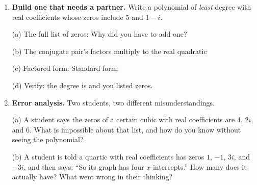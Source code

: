 \documentclass[10pt]{article}
\begin{document}
\begin{tcolorbox}[colback=white, colframe=black!40, title=\textbf{Tier A --- Approaching Proficiency},
    fonttitle=\bfseries, arc=1.5mm, left=3mm, right=3mm, top=2mm, bottom=2mm, breakable]
\begin{enumerate}[leftmargin=1.7em, itemsep=10pt]
    \vspace{2pt}
    (c) So the number of \emph{imaginary} zeros is \blank{1.2cm}. Check: is that number even?
    \blank{1.0cm}

    \vspace{2pt}
    (d) You did all of that \emph{without solving anything}. Explain in one sentence how the graph and
    the degree together gave you the answer. \blank{6.2cm}

    \vspace{2pt}
    (e) The function is $p(x) = x^4 - 3x^2 - 4$. Factor it in quadratic form and list all four zeros
    to confirm: \blank{5.4cm}

  \item \textbf{Build one that needs a partner.} Write a polynomial of \emph{least} degree with real
    coefficients whose zeros include $5$ and $1 - i$.

    \vspace{2pt}
    (a) The full list of zeros: \blank{4.0cm} \; Why did you have to add one? \blank{4.6cm}

    \vspace{2pt}
    (b) The conjugate pair's factors multiply to the real quadratic \blank{3.0cm}

    \vspace{2pt}
    (c) Factored form: \blank{4.6cm} \quad Standard form: \blank{4.6cm}

    \vspace{2pt}
    (d) Verify: the degree is \blank{0.8cm} and you listed \blank{0.8cm} zeros. \checkmark

  \item \textbf{Error analysis.} Two students, two different misunderstandings.

    \vspace{2pt}
    (a) A student says the zeros of a certain cubic with real coefficients are $4$, $2i$, and $6$.
    What is impossible about that list, and how do you know without seeing the polynomial?
    \blank{6.0cm}

    \vspace{2pt}
    (b) A student is told a quartic with real coefficients has zeros $1$, $-1$, $3i$, and $-3i$, and
    then says: ``So its graph has four $x$-intercepts.'' How many does it actually have?
    \blank{1.2cm} \; What went wrong in their thinking? \blank{5.4cm}
\end{enumerate}
\end{tcolorbox}
\end{document}
